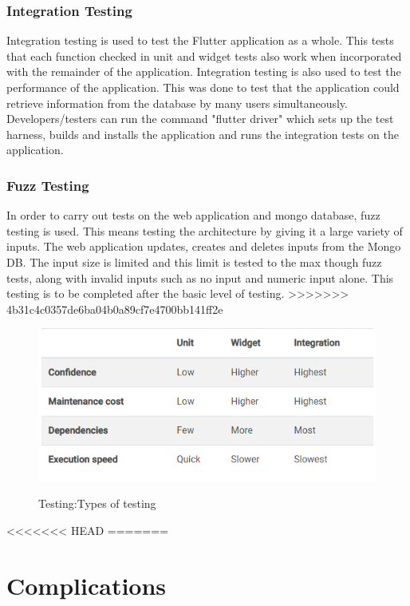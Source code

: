 \subsubsection{Integration Testing}

Integration testing is used to test the Flutter application as a whole. This tests that each function checked in unit and widget tests also work when incorporated with the remainder of the application. Integration testing is also used to test the performance of the application. This was done to test that the application could retrieve information from the database by many users simultaneously. Developers/testers can run the command "flutter driver" which sets up the test harness, builds and installs the application and runs the integration tests on the application. \cite{IntegrationTest}

\subsubsection{Fuzz Testing}
In order to carry out tests on the web application and mongo database, fuzz testing is used. This means testing the architecture by giving it a large variety of inputs. The web application updates, creates and deletes inputs from the Mongo DB. The input size is limited and this limit is tested to the max though fuzz tests, along with invalid inputs such as no input and numeric input alone. This testing is to be completed after the basic level of testing.
>>>>>>> 4b31c4c0357de6ba04b0a89cf7e4700bb141ff2e

\begin{figure}[ht!]
    \centering
 \includegraphics[width=125mm,scale=0.5]{img/Capture.PNG}
\caption{Testing:Types of testing}
\cite{testing}
\label{fig:method}
\end{figure}

<<<<<<< HEAD
=======
\section{Complications}
